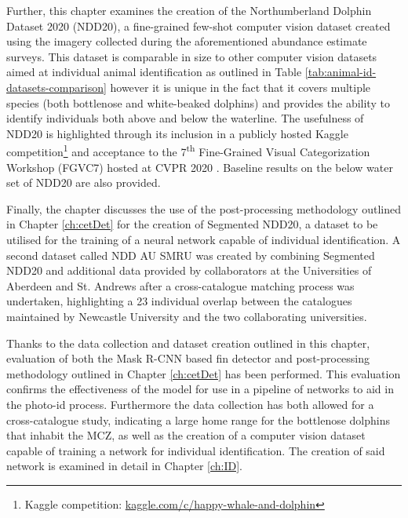 Further, this chapter examines the creation of the Northumberland Dolphin Dataset 2020 (NDD20), a fine-grained few-shot computer vision dataset created using the imagery collected during the aforementioned abundance estimate surveys. This dataset is comparable in size to other computer vision datasets aimed at individual animal identification as outlined in Table \ref{tab:animal-id-datasets-comparison} however it is unique in the fact that it covers multiple species (both bottlenose and white-beaked dolphins) and provides the ability to identify individuals both above and below the waterline. The usefulness of NDD20 is highlighted through its inclusion in a publicly hosted Kaggle competition\footnote{Kaggle competition: \href{https://www.kaggle.com/c/happy-whale-and-dolphin/}{kaggle.com/c/happy-whale-and-dolphin}} and acceptance to the 7\textsuperscript{th} Fine-Grained Visual Categorization Workshop (FGVC7) hosted at CVPR 2020 \cite{trotter_ndd20_2020}. Baseline results on the below water set of NDD20 are also provided. 

Finally, the chapter discusses the use of the post-processing methodology outlined in Chapter \ref{ch:cetDet} for the creation of Segmented NDD20, a dataset to be utilised for the training of a neural network capable of individual identification. A second dataset called NDD AU SMRU was created by combining Segmented NDD20 and additional data provided by collaborators at the Universities of Aberdeen and St. Andrews after a cross-catalogue matching process was undertaken, highlighting a 23 individual overlap between the catalogues maintained by Newcastle University and the two collaborating universities.

Thanks to the data collection and dataset creation outlined in this chapter, evaluation of both the Mask R-CNN based fin detector and post-processing methodology outlined in Chapter \ref{ch:cetDet} has been performed. This evaluation confirms the effectiveness of the model for use in a pipeline of networks to aid in the photo-id process. Furthermore the data collection has both allowed for a cross-catalogue study, indicating a large home range for the bottlenose dolphins that inhabit the MCZ, as well as the creation of a computer vision dataset capable of training a network for individual identification. The creation of said network is examined in detail in Chapter \ref{ch:ID}. 

